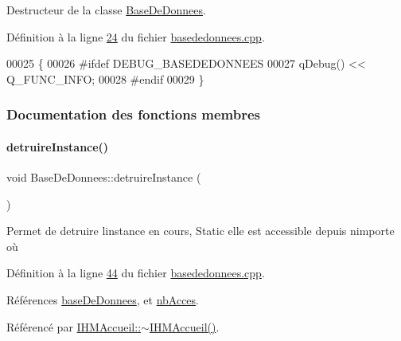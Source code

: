 Destructeur de la classe \hyperlink{class_base_de_donnees}{Base\+De\+Donnees}. 



Définition à la ligne \hyperlink{basededonnees_8cpp_source_l00024}{24} du fichier \hyperlink{basededonnees_8cpp_source}{basededonnees.\+cpp}.


\begin{DoxyCode}
00025 \{
00026 \textcolor{preprocessor}{    #ifdef DEBUG\_BASEDEDONNEES}
00027     qDebug() << Q\_FUNC\_INFO;
00028 \textcolor{preprocessor}{    #endif}
00029 \}
\end{DoxyCode}


\subsubsection{Documentation des fonctions membres}
\mbox{\label{class_base_de_donnees_a457401c0816b888c77ce915997545f4e}} 
\paragraph{\texorpdfstring{detruire\+Instance()}{detruireInstance()}}
{\footnotesize\ttfamily void Base\+De\+Donnees\+::detruire\+Instance (\begin{DoxyParamCaption}{ }\end{DoxyParamCaption})\hspace{0.3cm}{\ttfamily [static]}}



Permet de detruire l\textquotesingle{}instance en cours, Static elle est accessible depuis n\textquotesingle{}importe où 



Définition à la ligne \hyperlink{basededonnees_8cpp_source_l00044}{44} du fichier \hyperlink{basededonnees_8cpp_source}{basededonnees.\+cpp}.



Références \hyperlink{basededonnees_8h_source_l00027}{base\+De\+Donnees}, et \hyperlink{basededonnees_8h_source_l00029}{nb\+Acces}.



Référencé par \hyperlink{ihmaccueil_8cpp_source_l00031}{I\+H\+M\+Accueil\+::$\sim$\+I\+H\+M\+Accueil()}.


